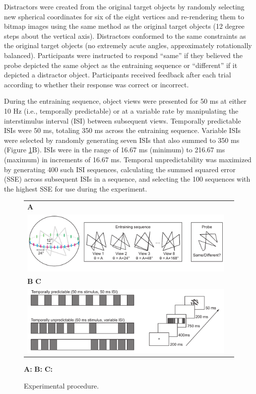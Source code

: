 \documentclass[dwyatte_dissertation.tex]{subfiles}
\begin{document}
Distractors were created from the original target objects by randomly selecting new spherical coordinates for six of the eight vertices and re-rendering them to bitmap images using the same method as the original target objects (12 degree steps about the vertical axis). Distractors conformed to the same constraints as the original target objects (no extremely acute angles, approximately rotationally balanced). Participants were instructed to respond ``same'' if they believed the probe depicted the same object as the entraining sequence or ``different'' if it depicted a distractor object. Participants received feedback after each trial according to whether their response was correct or incorrect. %

During the entraining sequence, object views were presented for 50 ms at either 10 Hz (i.e., temporally predictable) or at a variable rate by manipulating the interstimulus interval (ISI) between subsequent views. Temporally predictable ISIs were 50 ms, totaling 350 ms across the entraining sequence. Variable ISIs were selected by randomly generating seven ISIs that also summed to 350 ms (Figure \ref{fig:task}B). ISIs were in the range of 16.67 ms (minimum) to 216.67 ms (maximum) in increments of 16.67 ms. Temporal unpredictability was maximized by generating 400 such ISI sequences, calculating the summed squared error (SSE) across subsequent ISIs in a sequence, and selecting the 100 sequences with the highest SSE for use during the experiment.

\begin{figure}[h!]
\centering
\begin{tabular}{ll}
\textbf{A} \\
\includegraphics[width=160mm]{figs/pleast/paperclip_task.pdf} \\
\textbf{B} \hspace{90mm} \textbf{C} \\
\includegraphics[width=160mm]{figs/pleast/paperclip_ISI.pdf} \\
\end{tabular}
\caption{Experimental procedure.}{\textbf{A:} \textbf{B:} \textbf{C:}}
\label{fig:task}
\end{figure}
\end{document}
